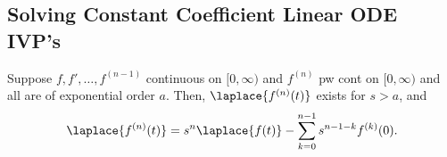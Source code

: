 \subsection{Solving Constant Coefficient Linear ODE IVP's}

\begin{theorem}\label{thm:laplacelinearconstantcoef}
    Suppose $f, f', \dots, f^{(n-1)}$ continuous on $[0, \infty)$ and $f^{(n)}$ pw cont on $[0, \infty)$ and all are of exponential order $a$. Then, $\laplace{f^{(n)}(t)}$ exists for $s > a$, and \[
    \laplace{f^{(n)}(t)} = s^n \laplace{f(t)}     - \sum_{k=0}^{n-1} s^{n-1-k} f^{(k)}(0).
    \]
\end{theorem}